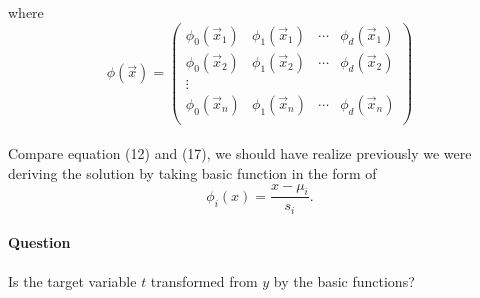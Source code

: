 \documentclass{article}
\begin{document}
where
\begin{equation*}
    \phi(\Vec{x}) = 
    \begin{pmatrix}
    \phi_0(\Vec{x}_1) & \phi_1(\Vec{x}_1) & \cdots & \phi_d(\Vec{x}_1) \\
    \phi_0(\Vec{x}_2) & \phi_1(\Vec{x}_2) & \cdots & \phi_d(\Vec{x}_2) \\
    \vdots \\
    \phi_0(\Vec{x}_n) & \phi_1(\Vec{x}_n) & \cdots & \phi_d(\Vec{x}_n) \\
    \end{pmatrix}
\end{equation*}

\paragraph{}
Compare equation (12) and (17), we should have realize previously we were deriving the solution by taking basic function in the form of 
\begin{equation*}
    \phi_i(x) = \frac{x-\mu_i}{s_i}.
\end{equation*}
\paragraph{Question} Is the target variable $t$ transformed from $y$ by the basic functions?
\end{document}
